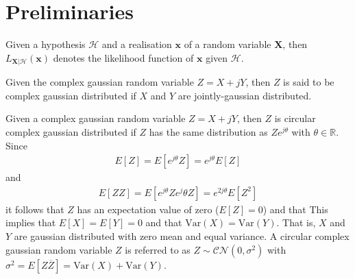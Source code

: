 \documentclass[a4paper, openany, oneside]{memoir}
\begin{document}
\section{Preliminaries}

\begin{blockDefinition}
Given a hypothesis $\mathcal{H}$ and a realisation $\mathbf{x}$ of a random variable $\mathbf{X}$, then $L_{\mathbf{X} | \mathcal{H}}(\mathbf{x})$ denotes the likelihood function of $\mathbf{x}$ given $\mathcal{H}$.
\end{blockDefinition}

\begin{blockDefinition}
Given the complex gaussian random variable $Z = X + jY$, then $Z$ is said to be complex gaussian distributed if $X$ and $Y$ are jointly-gaussian distributed.
\end{blockDefinition}

\begin{blockDefinition}
Given a complex gaussian random variable $Z = X + jY$, then $Z$ is circular complex gaussian distributed if $Z$ has the same distribution as $Ze^{j\theta}$ with $\theta \in \mathbb{R}$. Since
\begin{align*}
	E\left[Z\right] = E\left[e^{j\theta}Z\right]  = e^{j\theta}E\left[Z\right] 
\end{align*}
and
\begin{align*}
	E\left[ZZ\right] = E\left[e^{j\theta}Z e^j\theta{Z}\right]  = e^{2j\theta}E\left[Z^2\right] 
\end{align*}
it follows that $Z$  has an expectation value of zero ($E\left[Z\right] = 0$) and that %
This implies that $E\left[X\right] = E\left[Y\right] = 0$ and that $\text{Var}\left(X\right) = \text{Var}\left(Y\right)$. That is, $X$ and $Y$ are gaussian distributed
with zero mean and equal variance. 
A circular complex gaussian random variable $Z$ is referred to as $Z \sim \mathcal{CN}(0,\sigma^2)$ with $\sigma^2= E\left[Z\overline{Z}\right] = \text{Var}\left(X\right) + \text{Var}\left(Y\right)$. 
\end{blockDefinition}
\end{document}
